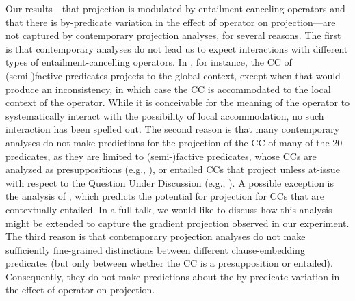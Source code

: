 \documentclass[12pt, a4paper]{article}
\begin{document}
	
	
	

	Our results---that projection is modulated by entailment-canceling operators and that there is by-predicate variation in the effect of operator on projection---are not captured by contemporary projection analyses, for several reasons.
	The first is that contemporary analyses do not lead us to expect interactions with different types of entailment-cancelling operators. In \citet{heim_projection_1983}, for instance, the CC of (semi-)factive predicates projects to the global context, except when that would produce an inconsistency, in which case the CC is accommodated to the local context of the operator. While it is conceivable for the meaning of the operator to systematically interact with the possibility of local accommodation, no such interaction has been spelled out.
	The second reason is that many contemporary analyses do not make predictions for the projection of the CC of many of the 20 predicates, as they are limited to (semi-)factive predicates, whose CCs are analyzed as presuppositions (e.g., \citealt{heim_projection_1983,van_der_sandt_presupposition_1992}), or entailed CCs that project unless at-issue with respect to the Question Under Discussion (e.g., \citealt{abrusan_predicting_2011,simons_best_2017}). A possible exception is the analysis of \citealt{schlenker_triggering_2021}, which predicts the potential for projection for CCs that are contextually entailed. In a full talk, we would like to discuss how this analysis might be extended to capture the gradient projection observed in our experiment.
	The third reason is that contemporary projection analyses do not make sufficiently fine-grained distinctions between different clause-embedding predicates (but only between whether the CC is a presupposition or entailed). Consequently, they do not make predictions about the by-predicate variation in the effect of operator on projection.
\end{document}

